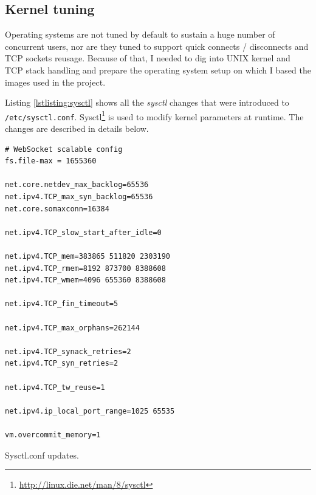 \documentclass{uvamscse}
\begin{document}
\subsection{Kernel tuning}\label{Kernel tuning}
Operating systems are not tuned by default to sustain a huge number of concurrent users, nor are they tuned to support quick connects / disconnects and TCP sockets reusage. Because of that, I needed to dig into UNIX kernel and TCP stack handling and prepare the operating system setup on which I based the images used in the project.

Listing \ref{lstlisting:sysctl} shows all the \textit{sysctl} changes that were introduced to \texttt{/etc/sysctl.conf}. Sysctl\footnote{\url{http://linux.die.net/man/8/sysctl}} is used to modify kernel parameters at runtime. The changes are described in details below.

\begin{sourcecode}[h]
\begin{lstlisting}[style=mono]
# WebSocket scalable config
fs.file-max = 1655360

net.core.netdev_max_backlog=65536
net.ipv4.TCP_max_syn_backlog=65536
net.core.somaxconn=16384

net.ipv4.TCP_slow_start_after_idle=0

net.ipv4.TCP_mem=383865 511820 2303190
net.ipv4.TCP_rmem=8192 873700 8388608
net.ipv4.TCP_wmem=4096 655360 8388608

net.ipv4.TCP_fin_timeout=5

net.ipv4.TCP_max_orphans=262144

net.ipv4.TCP_synack_retries=2
net.ipv4.TCP_syn_retries=2

net.ipv4.TCP_tw_reuse=1

net.ipv4.ip_local_port_range=1025 65535

vm.overcommit_memory=1
\end{lstlisting}
\caption{Sysctl.conf updates.}
\label{lstlisting:sysctl}
\end{sourcecode}
\end{document}
